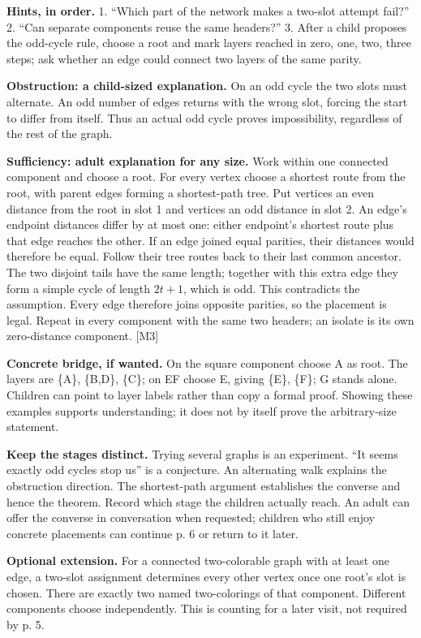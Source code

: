\documentclass[10pt,letterpaper]{article}
\newcommand{\topic}[1]{\vspace{3pt}{\large\bfseries #1}\par}
\newcommand{\labelled}[2]{\textbf{#1} #2\par}
\newcommand{\hint}[1]{\textbf{Hints, in order.} #1\par}
\begin{document}
\hint{1. ``Which part of the network makes a two-slot attempt fail?'' 2. ``Can separate components reuse the same headers?'' 3. After a child proposes the odd-cycle rule, choose a root and mark layers reached in zero, one, two, three steps; ask whether an edge could connect two layers of the same parity.}
\topic{Two directions, with their logical roles}
\labelled{Obstruction: a child-sized explanation.}{On an odd cycle the two slots must alternate. An odd number of edges returns with the wrong slot, forcing the start to differ from itself. Thus an actual odd cycle proves impossibility, regardless of the rest of the graph.}
\labelled{Sufficiency: adult explanation for any size.}{Work within one connected component and choose a root. For every vertex choose a shortest route from the root, with parent edges forming a shortest-path tree. Put vertices an even distance from the root in slot 1 and vertices an odd distance in slot 2. An edge's endpoint distances differ by at most one: either endpoint's shortest route plus that edge reaches the other. If an edge joined equal parities, their distances would therefore be equal. Follow their tree routes back to their last common ancestor. The two disjoint tails have the same length; together with this extra edge they form a simple cycle of length \(2t+1\), which is odd. This contradicts the assumption. Every edge therefore joins opposite parities, so the placement is legal. Repeat in every component with the same two headers; an isolate is its own zero-distance component. [M3]}
\labelled{Concrete bridge, if wanted.}{On the square component choose A as root. The layers are \{A\}, \{B,D\}, \{C\}; on EF choose E, giving \{E\}, \{F\}; G stands alone. Children can point to layer labels rather than copy a formal proof. Showing these examples supports understanding; it does not by itself prove the arbitrary-size statement.}
\labelled{Keep the stages distinct.}{Trying several graphs is an experiment. ``It seems exactly odd cycles stop us'' is a conjecture. An alternating walk explains the obstruction direction. The shortest-path argument establishes the converse and hence the theorem. Record which stage the children actually reach. An adult can offer the converse in conversation when requested; children who still enjoy concrete placements can continue p. 6 or return to it later.}
\labelled{Optional extension.}{For a connected two-colorable graph with at least one edge, a two-slot assignment determines every other vertex once one root's slot is chosen. There are exactly two named two-colorings of that component. Different components choose independently. This is counting for a later visit, not required by p. 5.}
\end{document}
